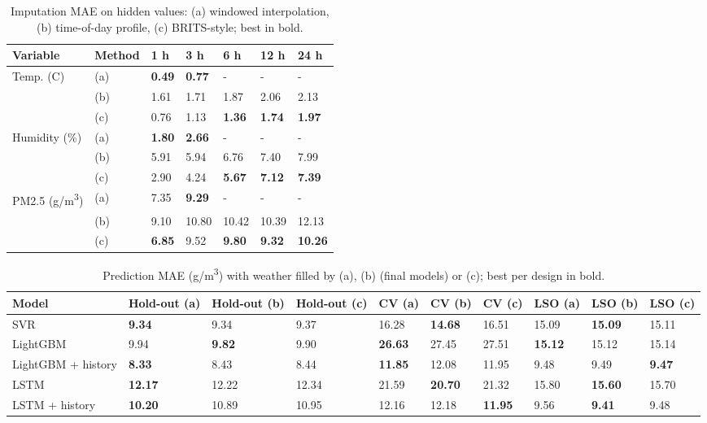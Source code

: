 \documentclass{ieeeaccess}
\newcommand{\ugm}{\textmu g/m\textsuperscript{3}}
\begin{document}
\begin{table}[t]
\caption{Imputation MAE on hidden values: (a) windowed interpolation, (b) time-of-day profile, (c) BRITS-style; best in bold.}
\label{tab:imputation}
\centering
\footnotesize
\begin{tabular}{lllllll}
\toprule
Variable & Method & 1 h & 3 h & 6 h & 12 h & 24 h \\
\midrule
Temp. (\textdegree{}C) & (a) & \textbf{0.49} & \textbf{0.77} & - & - & - \\
 & (b) & 1.61 & 1.71 & 1.87 & 2.06 & 2.13 \\
 & (c) & 0.76 & 1.13 & \textbf{1.36} & \textbf{1.74} & \textbf{1.97} \\
Humidity (\%) & (a) & \textbf{1.80} & \textbf{2.66} & - & - & - \\
 & (b) & 5.91 & 5.94 & 6.76 & 7.40 & 7.99 \\
 & (c) & 2.90 & 4.24 & \textbf{5.67} & \textbf{7.12} & \textbf{7.39} \\
PM2.5 (\ugm{}) & (a) & 7.35 & \textbf{9.29} & - & - & - \\
 & (b) & 9.10 & 10.80 & 10.42 & 10.39 & 12.13 \\
 & (c) & \textbf{6.85} & 9.52 & \textbf{9.80} & \textbf{9.32} & \textbf{10.26} \\
\bottomrule
\end{tabular}
\end{table}

\begin{table}[t]
\caption{Prediction MAE (\ugm{}) with weather filled by (a), (b) (final models) or (c); best per design in bold.}
\label{tab:downstream}
\centering
\footnotesize
\begin{tabular}{llllllllll}
\toprule
Model & Hold-out (a) & Hold-out (b) & Hold-out (c) & CV (a) & CV (b) & CV (c) & LSO (a) & LSO (b) & LSO (c) \\
\midrule
SVR & \textbf{9.34} & 9.34 & 9.37 & 16.28 & \textbf{14.68} & 16.51 & 15.09 & \textbf{15.09} & 15.11 \\
LightGBM & 9.94 & \textbf{9.82} & 9.90 & \textbf{26.63} & 27.45 & 27.51 & \textbf{15.12} & 15.12 & 15.14 \\
LightGBM + history & \textbf{8.33} & 8.43 & 8.44 & \textbf{11.85} & 12.08 & 11.95 & 9.48 & 9.49 & \textbf{9.47} \\
LSTM & \textbf{12.17} & 12.22 & 12.34 & 21.59 & \textbf{20.70} & 21.32 & 15.80 & \textbf{15.60} & 15.70 \\
LSTM + history & \textbf{10.20} & 10.89 & 10.95 & 12.16 & 12.18 & \textbf{11.95} & 9.56 & \textbf{9.41} & 9.48 \\
\bottomrule
\end{tabular}
\end{table}
\end{document}
